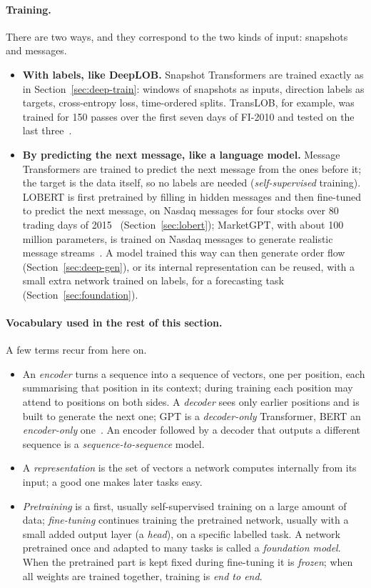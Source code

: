 \paragraph{Training.} There are two ways, and they correspond to the two kinds of input: snapshots and messages.
\begin{itemize}[leftmargin=1.5em,itemsep=2pt]
\item \textbf{With labels, like DeepLOB.} Snapshot Transformers are trained exactly as in
  Section~\ref{sec:deep-train}: windows of snapshots as inputs, direction labels as targets, cross-entropy loss,
  time-ordered splits. TransLOB, for example, was trained for 150 passes over the first seven days of FI-2010 and
  tested on the last three~\citep{wallbridge2020}.
\item \textbf{By predicting the next message, like a language model.} Message Transformers are trained to predict
  the next message from the ones before it; the target is the data itself, so no labels are needed
  (\emph{self-supervised} training). LOBERT is first pretrained by filling in hidden messages and then fine-tuned to predict the
  next message, on Nasdaq messages for four stocks over 80 trading days of 2015~\citep{linna2025lobert}
  (Section~\ref{sec:lobert}); MarketGPT, with about 100 million parameters, is trained on Nasdaq
  messages to generate realistic message streams~\citep{wheeler2024marketgpt}. A model trained this way can then
  generate order flow (Section~\ref{sec:deep-gen}), or its internal representation can be reused, with a small
  extra network trained on labels, for a forecasting task (Section~\ref{sec:foundation}).
\end{itemize}
\paragraph{Vocabulary used in the rest of this section.} A few terms recur from here on.
\begin{itemize}[leftmargin=1.5em,itemsep=1pt]
\item An \emph{encoder} turns a sequence into a sequence of vectors, one per position, each summarising that position in
  its context; during training each position may attend to positions on both sides. A \emph{decoder} sees only earlier
  positions and is built to generate the next one; GPT is a \emph{decoder-only} Transformer, BERT an
  \emph{encoder-only} one~\citep{devlin2019}. An encoder followed by a decoder that outputs a different sequence is a
  \emph{sequence-to-sequence} model.
\item A \emph{representation} is the set of vectors a network computes internally from its input; a good one makes
  later tasks easy.
\item \emph{Pretraining} is a first, usually self-supervised training on a large amount of data; \emph{fine-tuning}
  continues training the pretrained network, usually with a small added output layer (a \emph{head}), on a specific
  labelled task. A network pretrained once and adapted to many tasks is called a \emph{foundation model}. When the
  pretrained part is kept fixed during fine-tuning it is \emph{frozen}; when all weights are trained together, training
  is \emph{end to end}.
\end{itemize}

